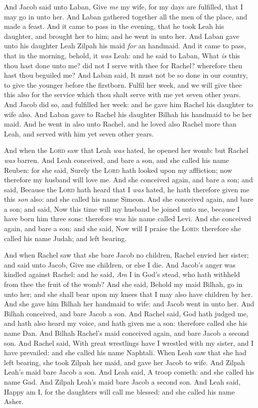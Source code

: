 \documentclass[11pt,letterpaper,oneside]{memoir}
\begin{document}
And Jacob said unto Laban, Give \emph{me} my wife, for my days are
fulfilled, that I may go in unto her. And Laban gathered together all
the men of the place, and made a feast. And it came to pass in the
evening, that he took Leah his daughter, and brought her to him; and he
went in unto her. And Laban gave unto his daughter Leah Zilpah his maid
\emph{for} an handmaid. And it came to pass, that in the morning,
behold, it \emph{was} Leah: and he said to Laban, What \emph{is} this
thou hast done unto me? did not I serve with thee for Rachel? wherefore
then hast thou beguiled me? And Laban said, It must not be so done in
our country, to give the younger before the firstborn. Fulfil her week,
and we will give thee this also for the service which thou shalt serve
with me yet seven other years. And Jacob did so, and fulfilled her week:
and he gave him Rachel his daughter to wife also. And Laban gave to
Rachel his daughter Bilhah his handmaid to be her maid. And he went in
also unto Rachel, and he loved also Rachel more than Leah, and served
with him yet seven other years.

And when the \textsc{Lord} saw that Leah \emph{was} hated, he opened her
womb: but Rachel \emph{was} barren. And Leah conceived, and bare a son,
and she called his name Reuben: for she said, Surely the \textsc{Lord}
hath looked upon my affliction; now therefore my husband will love me.
And she conceived again, and bare a son; and said, Because the
\textsc{Lord} hath heard that I \emph{was} hated, he hath therefore given
me this \emph{son} also: and she called his name Simeon. And she
conceived again, and bare a son; and said, Now this time will my husband
be joined unto me, because I have born him three sons: therefore was his
name called Levi. And she conceived again, and bare a son: and she said,
Now will I praise the \textsc{Lord}: therefore she called his name Judah;
and left bearing.

And when Rachel saw that she bare Jacob no children, Rachel envied her
sister; and said unto Jacob, Give me children, or else I die. And
Jacob's anger was kindled against Rachel: and he said, \emph{Am} I in
God's stead, who hath withheld from thee the fruit of the womb? And she
said, Behold my maid Bilhah, go in unto her; and she shall bear upon my
knees that I may also have children by her. And she gave him Bilhah her
handmaid to wife: and Jacob went in unto her. And Bilhah conceived, and
bare Jacob a son. And Rachel said, God hath judged me, and hath also
heard my voice, and hath given me a son: therefore called she his name
Dan. And Bilhah Rachel's maid conceived again, and bare Jacob a second
son. And Rachel said, With great wrestlings have I wrestled with my
sister, and I have prevailed: and she called his name Naphtali. When
Leah saw that she had left bearing, she took Zilpah her maid, and gave
her Jacob to wife. And Zilpah Leah's maid bare Jacob a son. And Leah
said, A troop cometh: and she called his name Gad. And Zilpah Leah's
maid bare Jacob a second son. And Leah said, Happy am I, for the
daughters will call me blessed: and she called his name Asher.
\end{document}
